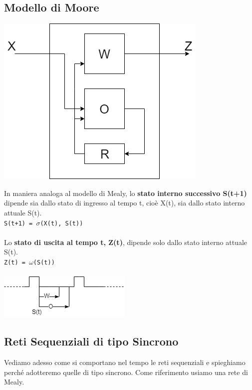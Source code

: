 \documentclass[10pt]{report}
\begin{document}
\subsection{Modello di Moore}
\begin{multicols}{2}
\includegraphics[scale=0.5]{moore.png}
\columnbreak

In maniera analoga al modello di Mealy, lo \textbf{stato interno successivo S(t+1)} dipende sia dallo stato di ingresso al tempo t, cioè X(t), sia dallo stato interno attuale S(t).\\
\texttt{S(t+1) = $\sigma$(X(t), S(t))}\\\\

Lo \textbf{stato di uscita al tempo t, Z(t)}, dipende solo dallo stato interno attuale S(t).\\
\texttt{Z(t) = $\omega$(S(t))}\\\\
\includegraphics[scale=0.8]{clockmemo.png}
\end{multicols}
\pagebreak
\subsection{Reti Sequenziali di tipo Sincrono}
Vediamo adesso come si comportano nel tempo le reti sequenziali e spieghiamo perché adotteremo quelle di tipo sincrono. Come riferimento usiamo una rete di Mealy.
\end{document}
